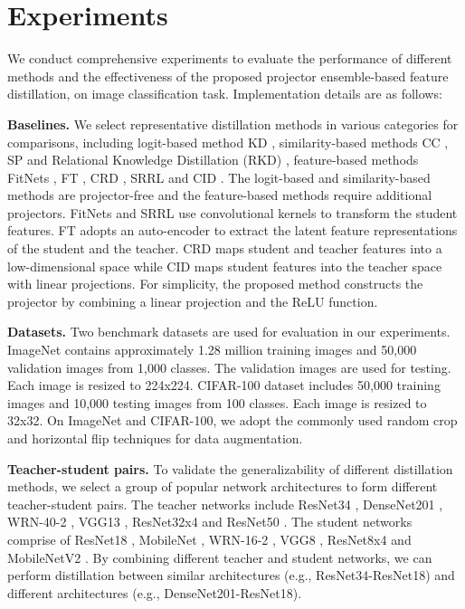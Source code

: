 \documentclass{article}
\begin{document}
\section{Experiments}
We conduct comprehensive experiments to evaluate the performance of different methods and the effectiveness of the proposed projector ensemble-based feature distillation, on image classification task. Implementation details are as follows:

\textbf{Baselines. }We select representative distillation methods in various categories for comparisons, including logit-based method KD \cite{kd}, similarity-based methods CC \cite{cc}, SP \cite{sp} and Relational Knowledge Distillation (RKD) \cite{rkd}, feature-based methods FitNets \cite{fitnets}, FT \cite{ft}, CRD \cite{crd}, SRRL \cite{srrl} and CID \cite{cid}. The logit-based and similarity-based methods are projector-free and the feature-based methods require additional projectors. FitNets and SRRL use convolutional kernels to transform the student features. FT adopts an auto-encoder to extract the latent feature representations of the student and the teacher. CRD maps student and teacher features into a low-dimensional space while CID maps student features into the teacher space with linear projections. For simplicity, the proposed method constructs the projector by combining a linear projection and the ReLU function.  

\textbf{Datasets. }Two benchmark datasets are used for evaluation in our experiments. ImageNet \cite{imagenet} contains approximately 1.28 million training images and 50,000 validation images from 1,000 classes. The validation images are used for testing. Each image is resized to 224x224. CIFAR-100 \cite{cifar100} dataset includes 50,000 training images and 10,000 testing images from 100 classes. Each image is resized to 32x32. On ImageNet and CIFAR-100, we adopt the commonly used random crop and horizontal flip techniques for data augmentation.

\textbf{Teacher-student pairs. }To validate the generalizability of different distillation methods, we select a group of popular network architectures to form different teacher-student pairs. The teacher networks include ResNet34 \cite{resnet}, DenseNet201 \cite{densenet}, WRN-40-2 \cite{wrn}, VGG13 \cite{vgg}, ResNet32x4 \cite{resnet} and ResNet50 \cite{resnet}. The student networks comprise of ResNet18 \cite{resnet}, MobileNet \cite{mobilenets}, WRN-16-2 \cite{wrn}, VGG8 \cite{vgg}, ResNet8x4 \cite{resnet} and MobileNetV2 \cite{mobilenetsv2}. By combining different teacher and student networks, we can perform distillation between similar architectures (e.g., ResNet34-ResNet18) and different architectures (e.g., DenseNet201-ResNet18).
\end{document}
